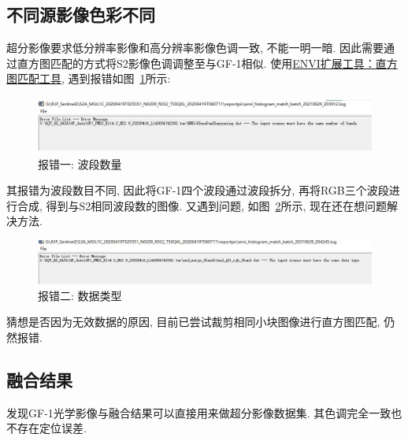 \subsection{不同源影像色彩不同}
超分影像要求低分辨率影像和高分辨率影像色调一致, 不能一明一暗. 因此需要通过直方图匹配的方式将S2影像色调调整至与GF-1相似. 使用\href{http://blog.sina.com.cn/s/blog_764b1e9d0102vqws.html}{ENVI扩展工具：直方图匹配工具}, 遇到报错如图~\ref{fig:0215}所示: 

\begin{figure}[!htbp]
    \centering
    \includegraphics[height=5em]{pic/q5_01.jpg}
    \caption{报错一: 波段数量}
    \label{fig:0215}
\end{figure}

其报错为波段数目不同, 因此将GF-1四个波段通过波段拆分, 再将RGB三个波段进行合成, 得到与S2相同波段数的图像. 又遇到问题, 如图~\ref{fig:0216}所示, 现在还在想问题解决方法. 

\begin{figure}[!htbp]
    \centering
    \includegraphics[height=4em]{pic/q5_02.jpg}
    \caption{报错二: 数据类型}
    \label{fig:0216}
\end{figure}

猜想是否因为无效数据的原因, 目前已尝试裁剪相同小块图像进行直方图匹配, 仍然报错. 

\subsection{融合结果}
发现GF-1光学影像与融合结果可以直接用来做超分影像数据集. 其色调完全一致也不存在定位误差.

